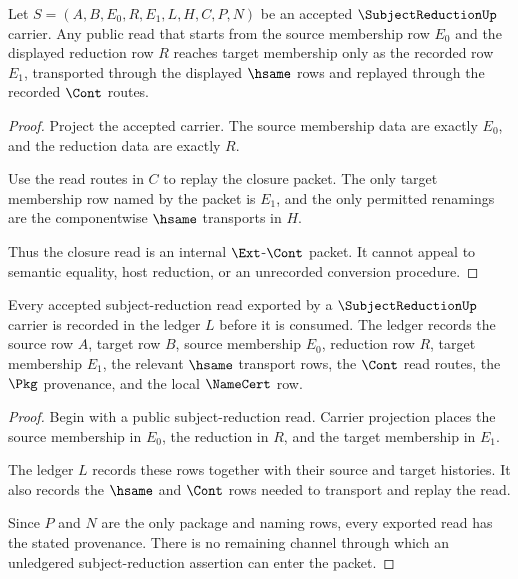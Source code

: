 \begin{theorem}
\label{thm:subject-reduction-ext-cont-closure}
Let $S=(A,B,E_0,R,E_1,L,H,C,P,N)$ be an accepted $\SubjectReductionUp$ carrier. Any public read that starts from the source membership row $E_0$ and the displayed reduction row $R$ reaches target membership only as the recorded row $E_1$, transported through the displayed $\hsame$ rows and replayed through the recorded $\Cont$ routes.
\end{theorem}
\begin{proof}
Project the accepted carrier. The source membership data are exactly $E_0$, and the reduction data are exactly $R$.

Use the read routes in $C$ to replay the closure packet. The only target membership row named by the packet is $E_1$, and the only permitted renamings are the componentwise $\hsame$ transports in $H$.

Thus the closure read is an internal $\Ext$-$\Cont$ packet. It cannot appeal to semantic equality, host reduction, or an unrecorded conversion procedure.
\end{proof}

\begin{theorem}
\label{thm:subject-reduction-ledger-exactness}
Every accepted subject-reduction read exported by a $\SubjectReductionUp$ carrier is recorded in the ledger $L$ before it is consumed. The ledger records the source row $A$, target row $B$, source membership $E_0$, reduction row $R$, target membership $E_1$, the relevant $\hsame$ transport rows, the $\Cont$ read routes, the $\Pkg$ provenance, and the local $\NameCert$ row.
\end{theorem}
\begin{proof}
Begin with a public subject-reduction read. Carrier projection places the source membership in $E_0$, the reduction in $R$, and the target membership in $E_1$.

The ledger $L$ records these rows together with their source and target histories. It also records the $\hsame$ and $\Cont$ rows needed to transport and replay the read.

Since $P$ and $N$ are the only package and naming rows, every exported read has the stated provenance. There is no remaining channel through which an unledgered subject-reduction assertion can enter the packet.
\end{proof}

